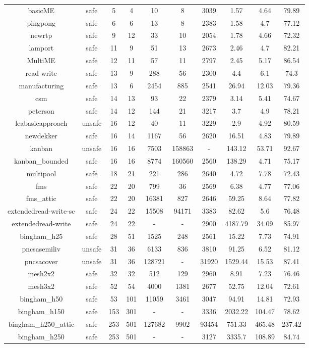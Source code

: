 \begin{table}[H]
{\begin{tabular}{c c c c c c c c c c}
basicME & safe & 5 & 4 & 10 & 8 & 3039 & 1.57 & 4.64 & 79.89 \\
        pingpong & safe & 6 & 6 & 13 & 8 & 2383 & 1.58 & 4.7 & 77.12 \\
        newrtp & safe & 9 & 12 & 33 & 10 & 2054 & 1.78 & 4.66 & 72.32 \\
        lamport & safe & 11 & 9 & 51 & 13 & 2673 & 2.46 & 4.7 & 82.21 \\
        MultiME & safe & 12 & 11 & 57 & 11 & 2797 & 2.45 & 5.17 & 86.54 \\
        read-write & safe & 13 & 9 & 288 & 56 & 2300 & 4.4 & 6.1 & 74.3 \\
        manufacturing & safe & 13 & 6 & 2454 & 885 & 2541 & 26.94 & 12.03 & 79.36 \\
        csm & safe & 14 & 13 & 93 & 22 & 2379 & 3.14 & 5.41 & 74.67 \\
        peterson & safe & 14 & 12 & 144 & 21 & 3217 & 3.7 & 4.9 & 78.21 \\
        leabasicapproach & unsafe & 16 & 12 & 40 & 11 & 3229 & 2.9 & 4.92 & 80.59 \\
        newdekker & safe & 16 & 14 & 1167 & 56 & 2620 & 16.51 & 4.83 & 79.89 \\
        kanban & unsafe & 16 & 16 & 7503 & 158863 & - & 143.12 & 53.71 & 92.67 \\
        kanban\_bounded & safe & 16 & 16 & 8774 & 160560 & 2560 & 138.29 & 4.71 & 75.17 \\
        multipool & safe & 18 & 21 & 221 & 286 & 2640 & 4.72 & 7.78 & 72.43 \\
        fms & safe & 22 & 20 & 799 & 36 & 2569 & 6.38 & 4.77 & 77.06 \\
        fms\_attic & safe & 22 & 20 & 16381 & 827 & 2646 & 59.25 & 8.64 & 77.82 \\
        extendedread-write-sc & safe & 24 & 22 & 15508 & 94171 & 3383 & 82.62 & 5.6 & 76.48 \\
        extendedread-write & safe & 24 & 22 & - & - & 2900 & 4187.79 & 34.09 & 85.97 \\
        bingham\_h25 & safe & 28 & 51 & 1525 & 248 & 2561 & 15.22 & 7.73 & 74.91 \\
        pncsasemiliv & unsafe & 31 & 36 & 6133 & 836 & 3810 & 91.25 & 6.52 & 81.12 \\
        pncsacover & unsafe & 31 & 36 & 128721 & - & 31920 & 1529.44 & 15.53 & 87.41 \\
        mesh2x2 & safe & 32 & 32 & 512 & 129 & 2960 & 8.91 & 7.23 & 76.46 \\
        mesh3x2 & safe & 52 & 54 & 4000 & 1381 & 2677 & 52.75 & 12.04 & 72.61 \\
        bingham\_h50 & safe & 53 & 101 & 11059 & 3461 & 3047 & 94.91 & 14.81 & 72.93 \\
        bingham\_h150 & safe & 153 & 301 & - & - & 3336 & 2032.22 & 104.47 & 78.62 \\
        bingham\_h250\_attic & safe & 253 & 501 & 127682 & 9902 & 93454 & 751.33 & 465.48 & 237.42 \\
        bingham\_h250 & safe & 253 & 501 & - & - & 3127 & 3335.7 & 108.89 & 84.74 \\


\end{tabular}}
\end{table}
